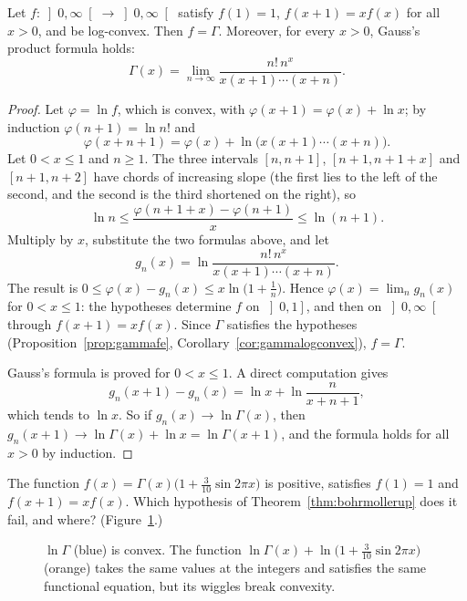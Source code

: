 \begin{theorem}\label{thm:bohrmollerup}
Let $f:\left]0,\infty\right[\to\left]0,\infty\right[$ satisfy $f(1)=1$, $f(x+1)=xf(x)$ for all $x>0$, and be log-convex. Then $f=\Gamma$.
Moreover, for every $x>0$, Gauss's product formula holds:
\[
\Gamma(x)=\lim_{n\to\infty}\frac{n!\,n^x}{x(x+1)\cdots(x+n)}.
\]
\end{theorem}
\begin{proof}
Let $\varphi=\ln f$, which is convex, with $\varphi(x+1)=\varphi(x)+\ln x$; by induction $\varphi(n+1)=\ln n!$ and
\[
\varphi(x+n+1)=\varphi(x)+\ln\bigl(x(x+1)\cdots(x+n)\bigr).
\]
Let $0<x\le1$ and $n\ge1$. The three intervals $[n,n+1]$, $[n+1,n+1+x]$ and $[n+1,n+2]$ have chords of increasing slope
(the first lies to the left of the second, and the second is the third shortened on the right), so
\[
\ln n\le\frac{\varphi(n+1+x)-\varphi(n+1)}x\le\ln(n+1).
\]
Multiply by $x$, substitute the two formulas above, and let
\[
g_n(x)=\ln\frac{n!\,n^x}{x(x+1)\cdots(x+n)}.
\]
The result is $0\le\varphi(x)-g_n(x)\le x\ln\bigl(1+\frac1n\bigr)$. Hence $\varphi(x)=\lim_ng_n(x)$ for $0<x\le1$: the hypotheses determine $f$
on $\left]0,1\right]$, and then on $\left]0,\infty\right[$ through $f(x+1)=xf(x)$. Since $\Gamma$ satisfies the hypotheses
(Proposition~\ref{prop:gammafe}, Corollary~\ref{cor:gammalogconvex}), $f=\Gamma$.

Gauss's formula is proved for $0<x\le1$. A direct computation gives
\[
g_n(x+1)-g_n(x)=\ln x+\ln\frac n{x+n+1},
\]
which tends to $\ln x$. So if $g_n(x)\to\ln\Gamma(x)$, then $g_n(x+1)\to\ln\Gamma(x)+\ln x=\ln\Gamma(x+1)$, and the formula holds for all $x>0$ by induction.
\end{proof}

\begin{think}
The function $f(x)=\Gamma(x)\bigl(1+\frac3{10}\sin2\pi x\bigr)$ is positive, satisfies $f(1)=1$ and $f(x+1)=xf(x)$. Which hypothesis
of Theorem~\ref{thm:bohrmollerup} does it fail, and where? (Figure~\ref{fig:loggamma}.)
\end{think}

\begin{figure}[ht]
\centering
{}
\caption{$\ln\Gamma$ (blue) is convex. The function $\ln\Gamma(x)+\ln\bigl(1+\frac3{10}\sin2\pi x\bigr)$ (orange) takes the same values at
the integers and satisfies the same functional equation, but its wiggles break convexity.}
\label{fig:loggamma}
\end{figure}

